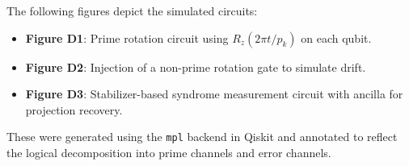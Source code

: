 \documentclass[12]{amsart}
\theoremstyle{plain}
\begin{document}
The following figures depict the simulated circuits:

\begin{itemize}
    \item \textbf{Figure D1}: Prime rotation circuit using \( R_z(2\pi t / p_k) \) on each qubit.
    \item \textbf{Figure D2}: Injection of a non-prime rotation gate to simulate drift.
    \item \textbf{Figure D3}: Stabilizer-based syndrome measurement circuit with ancilla for projection recovery.
\end{itemize}

These were generated using the \texttt{mpl} backend in Qiskit and annotated to reflect the logical decomposition into prime channels and error channels.
\end{document}
